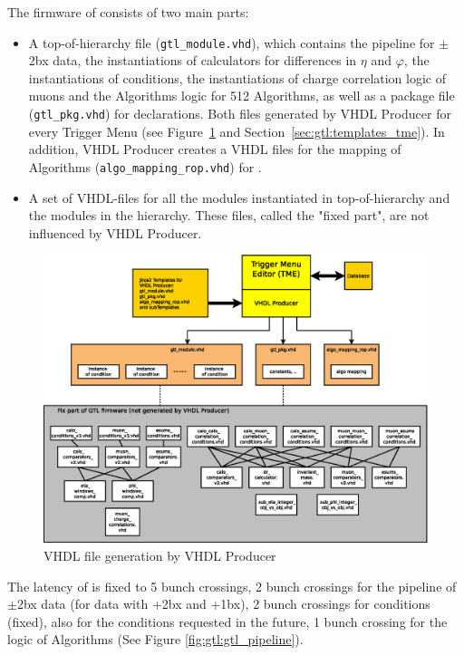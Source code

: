The firmware of \ugtl consists of two main parts:
\begin{itemize}
\item A top-of-hierarchy file (\texttt{gtl\_module.vhd}), which contains the pipeline for $\pm$2bx data, the instantiations of calculators for differences in $\eta$ and $\varphi$, the instantiations of
conditions, the instantiations of charge correlation logic of muons and the Algorithms logic for 512 Algorithms, as well as a package file (\texttt{gtl\_pkg.vhd}) for declarations.
Both files generated by VHDL Producer for every Trigger Menu (see Figure~\ref{fig:gtl:tme_gtl} and Section~\ref{sec:gtl:templates_tme}). In addition, VHDL Producer creates a VHDL files
for the mapping of Algorithms (\texttt{algo\_mapping\_rop.vhd}) for \ufdl.
\item A set of VHDL-files for all the modules instantiated in top-of-hierarchy and the modules in the hierarchy. These files, called the "fixed part", are not influenced by VHDL Producer. 
\end{itemize}

\begin{figure}[htb]
\centering
\includegraphics[width=15cm]{figures/tme_gtl}
\caption{VHDL file generation by VHDL Producer} 
\label{fig:gtl:tme_gtl}
\end{figure}

The latency of \ugtl is fixed to 5 bunch crossings,
2 bunch crossings for the pipeline of $\pm$2bx data (for data with +2bx and +1bx), 2 bunch crossings for conditions (fixed), also for the conditions requested in the future,
1 bunch crossing for the logic of Algorithms (See Figure \ref{fig:gtl:gtl_pipeline}).\\

